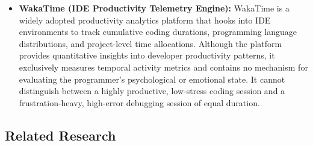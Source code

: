 \begin{itemize}
    \item \textbf{WakaTime (IDE Productivity Telemetry Engine):} WakaTime is a widely adopted productivity analytics platform that hooks into IDE environments to track cumulative coding durations, programming language distributions, and project-level time allocations. Although the platform provides quantitative insights into developer productivity patterns, it exclusively measures temporal activity metrics and contains no mechanism for evaluating the programmer's psychological or emotional state. It cannot distinguish between a highly productive, low-stress coding session and a frustration-heavy, high-error debugging session of equal duration.
\end{itemize}

\subsection{Related Research}
